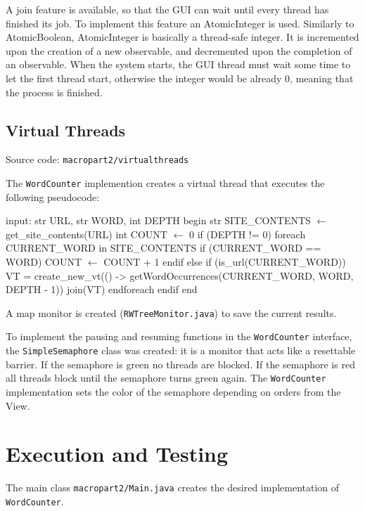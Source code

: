 \documentclass[12pt, a4paper]{report}
\begin{document}
A join feature is available, so that the GUI can wait until every thread has finished its job.
To implement this feature an AtomicInteger is used.
Similarly to AtomicBoolean, AtomicInteger is basically a thread-safe integer. It is incremented upon the creation of a new observable, and decremented upon the completion of an observable.
When the system starts, the GUI thread must wait some time to let the first thread start, otherwise the integer would be already 0, meaning that the process is finished.

\subsection{Virtual Threads}
Source code: \texttt{macropart2/virtualthreads}

The \texttt{WordCounter} implemention creates a virtual thread that executes the following pseudocode:

\newpage

\begin{algorithm}[label={alg5}]
input: str URL, str WORD, int DEPTH
begin
    str SITE_CONTENTS $\gets$ get_site_contents(URL)
    int COUNT $\gets$ 0
    if (DEPTH != 0)
        foreach CURRENT_WORD in SITE_CONTENTS
            if (CURRENT_WORD == WORD)
                COUNT $\gets$ COUNT + 1
            endif
            else if (is_url(CURRENT_WORD))
                VT = create_new_vt(() -> 
                    getWordOccurrences(CURRENT_WORD, WORD, DEPTH - 1))
                join(VT)
        endforeach
    endif
end       
\end{algorithm}

A map monitor is created (\texttt{RWTreeMonitor.java}) to save the current results.

To implement the pausing and resuming functions in the
 \texttt{WordCounter} interface, the \texttt{SimpleSemaphore} class was created: it is a monitor that acts like a resettable barrier. If the
 semaphore is green no threads are blocked. If the semaphore is red all threads block until the semaphore turns green again. The \texttt{WordCounter}
 implementation sets the color of the semaphore depending on orders from the View.

\section{Execution and Testing}
The main class \texttt{macropart2/Main.java} creates the desired implementation of \texttt{WordCounter}.
\end{document}
